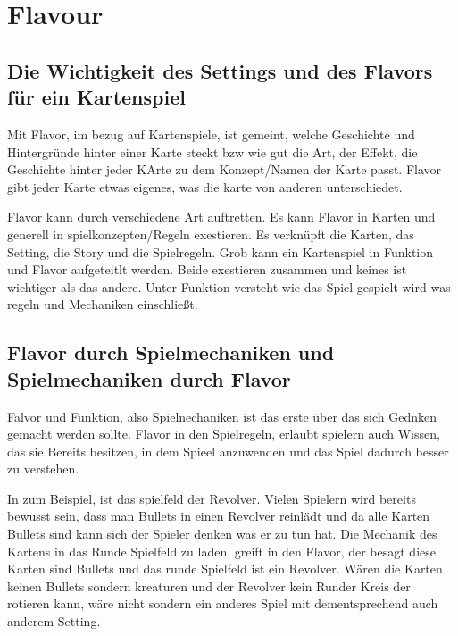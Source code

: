 
\section{Flavour}\label{sec:flavour}

\renewcommand{\kapitelautor}{Autor: Irgendwer} %

\subsection{Die Wichtigkeit des Settings und des Flavors für ein Kartenspiel}\label{subsec:wichtigkeit-des-flavours}

%
Mit Flavor, im bezug auf Kartenspiele, ist gemeint, welche Geschichte und Hintergründe hinter einer Karte steckt bzw wie gut die Art, der Effekt,
die Geschichte hinter jeder KArte zu dem Konzept/Namen der Karte passt. Flavor gibt jeder Karte etwas eigenes, was die karte von anderen unterschiedet.

Flavor kann durch verschiedene Art auftretten. Es kann Flavor in Karten und generell in spielkonzepten/Regeln exestieren.
Es verknüpft die Karten, das Setting, die Story und die Spielregeln. Grob kann ein Kartenspiel in Funktion und Flavor aufgeteitlt werden.
Beide exestieren zusammen und keines ist wichtiger als das andere. Unter Funktion versteht wie das Spiel gespielt wird was regeln und Mechaniken einschließt. \cite{flavorAndFunction}

%
\subsection{Flavor durch Spielmechaniken und Spielmechaniken durch Flavor}\label{subsec:flavour-durch-mechaniken}

Falvor und Funktion, also Spielnechaniken ist das erste über das sich Gednken gemacht werden sollte.
Flavor in den Spielregeln, erlaubt spielern auch Wissen, das sie Bereits besitzen, in dem Spieel anzuwenden und das Spiel dadurch besser zu verstehen. \cite{flavorAndFunction}

In \FF zum Beispiel, ist das spielfeld der Revolver. Vielen Spielern wird bereits bewusst sein, dass man Bullets in einen Revolver reinlädt und da alle Karten Bullets sind kann sich der Spieler
denken was er zu tun hat. Die Mechanik des Kartens in das Runde Spielfeld zu laden, greift in den Flavor, der besagt diese Karten sind Bullets und das runde Spielfeld ist ein Revolver.
Wären die Karten keinen Bullets sondern kreaturen und der Revolver kein Runder Kreis der rotieren kann, wäre \FF nicht \FF sondern ein anderes Spiel mit dementsprechend auch anderem Setting.

